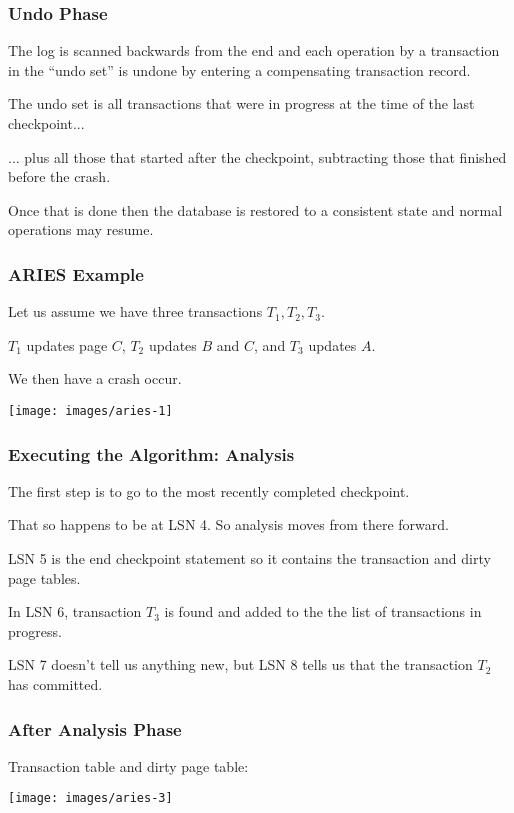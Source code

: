 \begin{frame}
\frametitle{Undo Phase}

The log is scanned backwards from the end and each operation by a transaction in the ``undo set'' is undone by entering a compensating transaction record. 

The undo set is all transactions that were in progress at the time of the last checkpoint...

... plus all those that started after the checkpoint, subtracting those that finished before the crash.

Once that is done then the database is restored to a consistent state and normal operations may resume. 

\end{frame}


\begin{frame}
\frametitle{ARIES Example}

Let us assume we have three transactions $T_{1}, T_{2}, T_{3}$.

$T_{1}$ updates page $C$, $T_{2}$ updates $B$ and $C$, and $T_{3}$ updates $A$. 

We then have a crash occur.

\begin{center}
\texttt{[image: images/aries-1]}
\end{center}

\end{frame}

\begin{frame}
\frametitle{Executing the Algorithm: Analysis}

The first step is to go to the most recently completed checkpoint. 

That so happens to be at LSN 4. So analysis moves from there forward. 

LSN 5 is the end checkpoint statement so it contains the transaction and dirty page tables. 

In LSN 6, transaction $T_{3}$ is found and added to the the list of transactions in progress. 

LSN 7 doesn't tell us anything new, but LSN 8 tells us that the transaction $T_{2}$ has committed. 

\end{frame}



\begin{frame}
\frametitle{After Analysis Phase}

Transaction table and dirty page table:

\begin{center}
\texttt{[image: images/aries-3]}
\end{center}


\end{frame}


